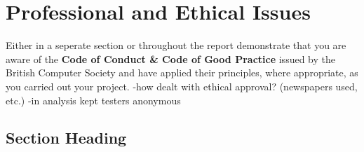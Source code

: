\chapter{Professional and Ethical Issues}
Either in a seperate section or throughout the report demonstrate that you are aware of the \textbf{Code of Conduct \& Code of Good Practice} issued by the British Computer Society and have applied their principles, where appropriate, as you carried out your project.
-how dealt with ethical approval? (newspapers used, etc.)
-in analysis kept testers anonymous
\section{Section Heading}
